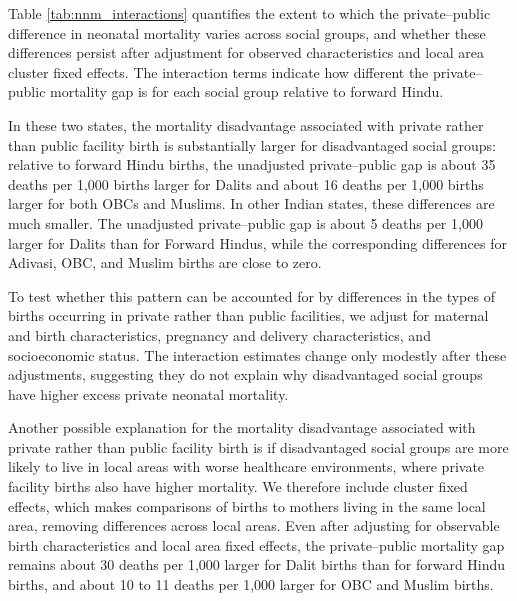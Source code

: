 \documentclass[12pt]{article}
\begin{document}
Table \ref{tab:nnm_interactions} quantifies the extent to which the private–public difference in neonatal mortality varies across social groups, and whether these differences persist after adjustment for observed characteristics and local area cluster fixed effects. The interaction terms indicate how different the private–public mortality gap is for each social group relative to forward Hindu.

In these two states, the mortality disadvantage associated with private rather than public facility birth is substantially larger for disadvantaged social groups: relative to forward Hindu births, the unadjusted private–public gap is about 35 deaths per 1,000 births larger for Dalits and about 16 deaths per 1,000 births larger for both OBCs and Muslims. In other Indian states, these differences are much smaller. The unadjusted private–public gap is about 5 deaths per 1,000 larger for Dalits than for Forward Hindus, while the corresponding differences for Adivasi, OBC, and Muslim births are close to zero.

To test whether this pattern can be accounted for by differences in the types of births occurring in private rather than public facilities, we adjust for maternal and birth characteristics, pregnancy and delivery characteristics, and socioeconomic status. The interaction estimates change only modestly after these adjustments, suggesting they do not explain why disadvantaged social groups have higher excess private neonatal mortality.

Another possible explanation for the mortality disadvantage associated with private rather than public facility birth is if disadvantaged social groups are more likely to live in local areas with worse healthcare environments, where private facility births also have higher mortality. We therefore include cluster fixed effects, which makes comparisons of births to mothers living in the same local area, removing differences across local areas. Even after adjusting for observable birth characteristics and local area fixed effects, the private–public mortality gap remains about 30 deaths per 1,000 larger for Dalit births than for forward Hindu births, and about 10 to 11 deaths per 1,000 larger for OBC and Muslim births.


\end{document}
